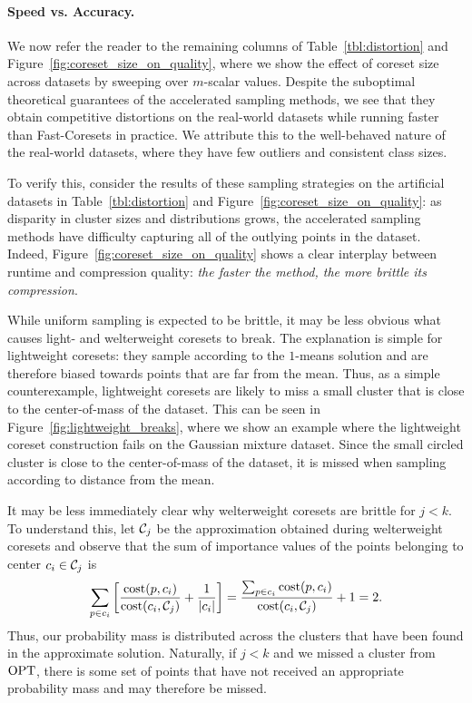 \paragraph*{Speed vs. Accuracy.}



We now refer the reader to the remaining columns of Table~\ref{tbl:distortion} and Figure~\ref{fig:coreset_size_on_quality}, where we show the effect of coreset
size across datasets by sweeping over $m$-scalar values. Despite the suboptimal theoretical guarantees of the accelerated sampling methods, we see that they
obtain competitive distortions on the real-world datasets while running faster than Fast-Coresets in practice. We attribute this to the well-behaved nature of
the real-world datasets, where they have few outliers and consistent class sizes.

To verify this, consider the results of these sampling strategies on the artificial datasets in Table~\ref{tbl:distortion} and
Figure~\ref{fig:coreset_size_on_quality}: as disparity in cluster sizes and distributions grows, the accelerated sampling methods have difficulty capturing all
of the outlying points in the dataset. Indeed, Figure~\ref{fig:coreset_size_on_quality} shows a clear interplay between runtime and compression quality: \emph{the
faster the method, the more brittle its compression}.



While uniform sampling is expected to be brittle, it may be less obvious what causes light- and welterweight coresets to break. The explanation is simple for
lightweight coresets: they sample according to the $1$-means solution and are therefore biased towards points that are far from the mean. Thus, as a simple
counterexample, lightweight coresets are likely to miss a small cluster that is close to the center-of-mass of the dataset. This can be seen in
Figure~\ref{fig:lightweight_breaks}, where we show an example where the lightweight coreset construction fails on the Gaussian mixture dataset. Since the small
circled cluster is close to the center-of-mass of the dataset, it is missed when sampling according to distance from the mean.

It may be less immediately clear why welterweight coresets are brittle for $j < k$. To understand this, let $\mathcal C_j$ be the approximation obtained during
welterweight coresets and observe that the sum of importance values of the points belonging to center $c_i \in \mathcal C_j$ is \[ \sum_{p \in c_i} \left[
\dfrac{\operatorname{cost}(p, c_i)}{\operatorname{cost}(c_i, \mathcal C_j)} + \dfrac{1}{|c_i|} \right] = \dfrac{\sum_{p \in c_i} \operatorname{cost}(p, c_i)}{\operatorname{cost}(c_i, \mathcal C_j)} + 1 = 2.\] Thus, our
probability mass is distributed across the clusters that have been found in the approximate solution. Naturally, if $j < k$ and we missed a cluster from $\text{OPT}$,
there is some set of points that have not received an appropriate probability mass and may therefore be missed.

